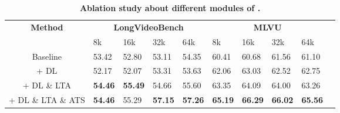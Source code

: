 


\renewcommand{\arraystretch}{1.0} %
\begin{table}[t]
\setlength\tabcolsep{3pt} %
\centering
\caption {\textbf{Ablation study about different modules of \methodname.}
}\label{tab:ablation_modules}
\vspace{1mm} %
\scriptsize %
\begin{tabular}{@{}clllllllll@{}}
\hline
\multirow{2}{*}{\textbf{Method}}  & \multicolumn{4}{c}{\textbf{LongVideoBench}} & \multicolumn{4}{c}{\textbf{MLVU}} \\ 
\cmidrule(lr){2-5}
\cmidrule(lr){6-9}
 & 8k & 16k & 32k & 64k & 8k & 16k & 32k & 64k \\ \hline
Baseline & 53.42 & 52.80 & 53.11 & 54.35 & 60.41 & 60.68 & 61.56 & 61.10 \\
+ DL & 52.17 & 52.07 & 53.31 & 53.63 & 62.06 & 63.03 & 62.52 & 62.75 \\
+ DL \& LTA & \textbf{54.46} & \textbf{55.49} & 54.66 & 55.60 & 63.35 & 64.09 & 64.00 & 63.26  \\
+ DL \& LTA \& ATS & {\textbf{54.46}} & 55.29 & {\textbf{57.15}} & {\textbf{57.26}} & {\textbf{65.19}} & \textbf{66.29} & \textbf{66.02} & \textbf{65.56} \\ \hline
\end{tabular}
\end{table}

